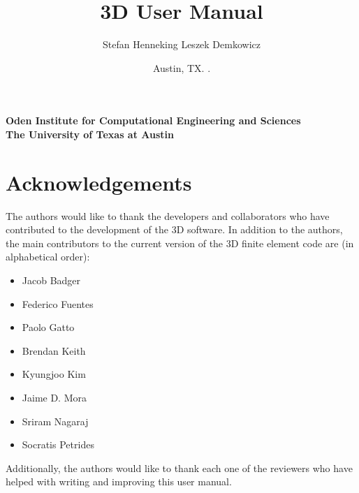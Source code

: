 \documentclass[11pt]{report}
\begin{document}
\baselineskip=16pt
\parskip=4pt

\begin{titlepage}

\title
{
\Huge
\hp3D User Manual
}

\author
{
\LARGE
Stefan Henneking
\hskip 40pt
Leszek Demkowicz
}

\affil
{
\large \bf
Oden Institute for Computational Engineering and Sciences\\
\large \bf
The University of Texas at Austin
}

\date
{
\large
Austin, TX. \the\year{}.
}

\maketitle

\end{titlepage}

\clearpage
{}
\setcounter{page}{2} 

\chapter*{Acknowledgements}

The authors would like to thank the developers and collaborators who have contributed to the development of the \hp3D software. In addition to the authors, the main contributors to the current version of the \hp3D finite element code are (in alphabetical order):

\begin{itemize}
	\itemsep 0pt
	\item Jacob Badger
	\item Federico Fuentes
	\item Paolo Gatto
	\item Brendan Keith
	\item Kyungjoo Kim
	\item Jaime D. Mora
	\item Sriram Nagaraj
	\item Socratis Petrides
\end{itemize}

Additionally, the authors would like to thank each one of the reviewers who have helped with writing and improving this user manual.

\vskip 25pt
\end{document}
